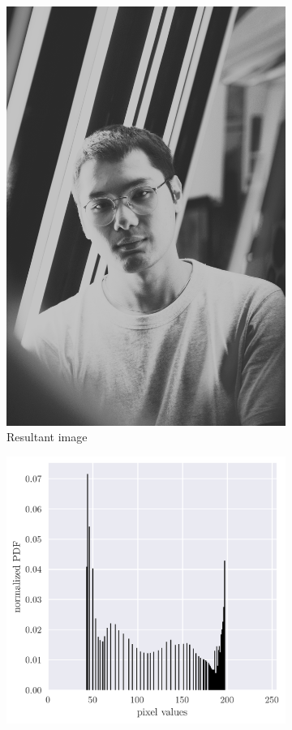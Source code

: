 \documentclass[12pt,a4paper]{article}
\begin{document}
\begin{figure}
\begin{subfigure}[h!]{0.24\textwidth}
		\includegraphics[width=\textwidth]{crushed.png}
		\caption{Resultant image}
		\label{fig:crushed}
	\end{subfigure}
	\begin{subfigure}[h!]{0.33\textwidth}
		\centering
		\includegraphics[width=\textwidth]{crush_hist.png}

\end{subfigure}
\end{figure}
\end{document}
